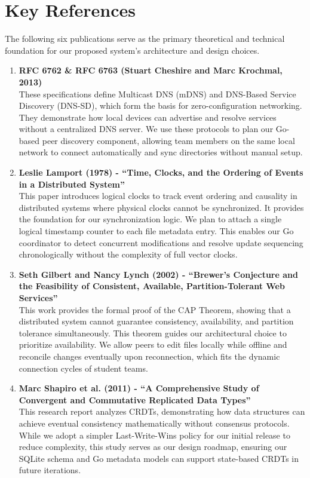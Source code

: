 \section{Key References}

The following six publications serve as the primary theoretical and technical foundation for our proposed system's architecture and design choices.

\begin{enumerate}
    \item \textbf{RFC 6762 \& RFC 6763 (Stuart Cheshire and Marc Krochmal, 2013)} \cite{rfc6762, rfc6763} \\
    These specifications define Multicast DNS (mDNS) and DNS-Based Service Discovery (DNS-SD), which form the basis for zero-configuration networking. They demonstrate how local devices can advertise and resolve services without a centralized DNS server. We use these protocols to plan our Go-based peer discovery component, allowing team members on the same local network to connect automatically and sync directories without manual setup.

    \item \textbf{Leslie Lamport (1978) - ``Time, Clocks, and the Ordering of Events in a Distributed System''} \cite{lamport1978} \\
    This paper introduces logical clocks to track event ordering and causality in distributed systems where physical clocks cannot be synchronized. It provides the foundation for our synchronization logic. We plan to attach a single logical timestamp counter to each file metadata entry. This enables our Go coordinator to detect concurrent modifications and resolve update sequencing chronologically without the complexity of full vector clocks.

    \item \textbf{Seth Gilbert and Nancy Lynch (2002) - ``Brewer's Conjecture and the Feasibility of Consistent, Available, Partition-Tolerant Web Services''} \cite{brewer2002} \\
    This work provides the formal proof of the CAP Theorem, showing that a distributed system cannot guarantee consistency, availability, and partition tolerance simultaneously. This theorem guides our architectural choice to prioritize availability. We allow peers to edit files locally while offline and reconcile changes eventually upon reconnection, which fits the dynamic connection cycles of student teams.

    \item \textbf{Marc Shapiro et al. (2011) - ``A Comprehensive Study of Convergent and Commutative Replicated Data Types''} \cite{shapiro2011} \\
    This research report analyzes CRDTs, demonstrating how data structures can achieve eventual consistency mathematically without consensus protocols. While we adopt a simpler Last-Write-Wins policy for our initial release to reduce complexity, this study serves as our design roadmap, ensuring our SQLite schema and Go metadata models can support state-based CRDTs in future iterations.


\end{enumerate}
